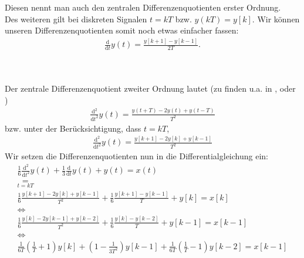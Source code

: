 \documentclass[11pt,a4paper,DIV=12]{scrartcl}
\begin{document}
Diesen nennt man auch den zentralen Differenzenquotienten erster Ordnung.\\
Des weiteren gilt bei diskreten Signalen $t=kT$ bzw. $y(kT)=y[k]$. Wir können unseren Differenzenquotienten somit noch etwas einfacher fassen:
\begin{gather}
	\frac{\mathrm{d}}{\mathrm{d}t}y(t)=\frac{y[k+1]-y[k-1]}{2T}.
\end{gather}
\\
\begin{figure}[h]
\centering
{}
\end{figure}
\\
Der zentrale Differenzenquotient zweiter Ordnung lautet (zu finden u.a. in \cite[Kap. 5, S. 138]{Reinhardt2012}, \cite[Kap. 5, S. 149]{MeisterSonar2019} oder \cite[Kap. 8, S. 184]{Scholz2016})
\begin{gather}
	\frac{\mathrm{d}^2}{\mathrm{d}t^2}y(t)=\frac{y(t+T)-2y(t)+y(t-T)}{T^2}
\end{gather}
bzw. unter der Berücksichtigung, dass $t=kT$,
\begin{gather}
	\frac{\mathrm{d}^2}{\mathrm{d}t^2}y(t)=\frac{y[k+1]-2y[k]+y[k-1]}{T^2}
\end{gather}
Wir setzen die Differenzenquotienten nun in die Differentialgleichung ein:
\begin{gather}
	\frac{1}{6}\frac{\mathrm{d}^2}{\mathrm{d}t^2}y(t)+\frac{1}{3}\frac{\mathrm{d}}{\mathrm{d}t}y(t)+y(t)=x(t)\\
	\underset{t=kT}{=}\nonumber\\
	\frac{1}{6}\frac{y[k+1]-2y[k]+y[k-1]}{T^2}+\frac{1}{6}\frac{y[k+1]-y[k-1]}{T}+y[k]=x[k]\\
	\Longleftrightarrow\nonumber\\
	\frac{1}{6}\frac{y[k]-2y[k-1]+y[k-2]}{T^2}+\frac{1}{6}\frac{y[k]-y[k-2]}{T}+y[k-1]=x[k-1]\\
	\Longleftrightarrow\nonumber\\
	\frac{1}{6T}\left(\frac{1}{T}+1\right)y[k]+\left(1-\frac{1}{3T^2}\right)y[k-1]+\frac{1}{6T}\left(\frac{1}{T}-1\right)y[k-2]=x[k-1]
\end{gather}
\end{document}
